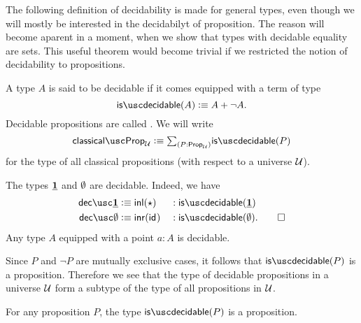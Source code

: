 The following definition of decidability is made for general types, even though we will mostly be interested in the decidabilyt of proposition. The reason will become aparent in a moment, when we show that types with decidable equality are sets. This useful theorem would become trivial if we restricted the notion of decidability to propositions.

\begin{defn}
  A type $A$ is said to be decidable if it comes equipped with a term of type
  \begin{equation*}
    \isdecidable(A)\defeq A+\neg A.
  \end{equation*}
  Decidable propositions are called . We will write
  \begin{equation*}
    \classicalprop_\UU \defeq \sm{P:\prop_\UU}\isdecidable(P)
  \end{equation*}
  for the type of all classical propositions (with respect to a universe $\mathcal{U}$).
\end{defn}

\begin{eg}\label{eg:classical-prop}
  The types $\underline{\mathbf{1}}$ and $\emptyset$ are decidable. Indeed, we have
  \begin{align*}
    \decunit & \defeq \inl(\ttt) & & :\isdecidable(\unit) \\
    \decemptyt & \defeq \inr(\idfunc) & & : \isdecidable(\emptyt).\qedhere
  \end{align*}
  Any type $A$ equipped with a point $a:A$ is decidable.
\end{eg}

Since $P$ and $\neg P$ are mutually exclusive cases, it follows that $\isdecidable(P)$ is a proposition. Therefore we see that the type of decidable propositions in a universe $\mathcal{U}$ form a subtype of the type of all propositions in $\mathcal{U}$.

\begin{lem}\label{lem:isprop-isdecidable}
  For any proposition $P$, the type $\isdecidable(P)$ is a proposition.
\end{lem}


